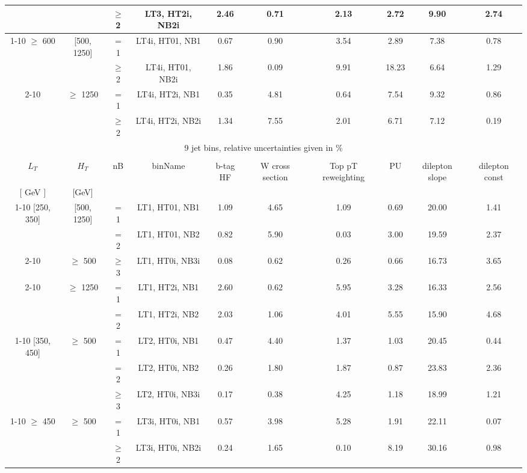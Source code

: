 \begin{table}[ht]
\begin{center}
\begin{tabular}{|c | c | c | c | c | c | c | c | c | c | }
  &  & $\geq$ 2&LT3, HT2i, NB2i & 2.46 & 0.71 & 2.13 & 2.72 & 9.90 & 2.74 \\ 
\cline{1-10} $\geq$ 600 & [500, 1250] & $=$ 1&LT4i, HT01, NB1 & 0.67 & 0.90 & 3.54 & 2.89 & 7.38 & 0.78 \\ 
  &  & $\geq$ 2&LT4i, HT01, NB2i & 1.86 & 0.09 & 9.91 & 18.23 & 6.64 & 1.29 \\ 
\cline{2-10}  & $\geq$ 1250 & $=$ 1&LT4i, HT2i, NB1 & 0.35 & 4.81 & 0.64 & 7.54 & 9.32 & 0.86 \\ 
  &  & $\geq$ 2&LT4i, HT2i, NB2i & 1.34 & 7.55 & 2.01 & 6.71 & 7.12 & 0.19 \\ 
 \hline 
\multicolumn{10}{|c|}{9 jet bins, relative uncertainties given in \%} \\ 
\multicolumn{10}{|c|}{} \\ \hline 
$L_T$ & $H_T$ & nB & binName & b-tag HF & W cross section & Top pT reweighting & PU & dilepton slope & dilepton const  \\ 
 $[$ GeV $]$  &   $[$GeV$]$ & &  &  &  &  &  &  &   \\ \hline 
\cline{1-10} [250, 350] & [500, 1250] & $=$ 1&LT1, HT01, NB1 & 1.09 & 4.65 & 1.09 & 0.69 & 20.00 & 1.41 \\ 
  &  & $=$ 2&LT1, HT01, NB2 & 0.82 & 5.90 & 0.03 & 3.00 & 19.59 & 2.37 \\ 
\cline{2-10}  & $\geq$ 500 & $\geq$ 3&LT1, HT0i, NB3i & 0.08 & 0.62 & 0.26 & 0.66 & 16.73 & 3.65 \\ 
\cline{2-10}  & $\geq$ 1250 & $=$ 1&LT1, HT2i, NB1 & 2.60 & 0.62 & 5.95 & 3.28 & 16.33 & 2.56 \\ 
  &  & $=$ 2&LT1, HT2i, NB2 & 2.03 & 1.06 & 4.01 & 5.55 & 15.90 & 4.68 \\ 
\cline{1-10} [350, 450] & $\geq$ 500 & $=$ 1&LT2, HT0i, NB1 & 0.47 & 4.40 & 1.37 & 1.03 & 20.45 & 0.44 \\ 
  &  & $=$ 2&LT2, HT0i, NB2 & 0.26 & 1.80 & 1.87 & 0.87 & 23.83 & 2.36 \\ 
  &  & $\geq$ 3&LT2, HT0i, NB3i & 0.17 & 0.38 & 4.25 & 1.18 & 18.99 & 1.21 \\ 
\cline{1-10} $\geq$ 450 & $\geq$ 500 & $=$ 1&LT3i, HT0i, NB1 & 0.57 & 3.98 & 5.28 & 1.91 & 22.11 & 0.07 \\ 
  &  & $\geq$ 2&LT3i, HT0i, NB2i & 0.24 & 1.65 & 0.10 & 8.19 & 30.16 & 0.98 \\ 
 \hline 
\hline 
\end{tabular} 
\end{center} 
\end{table} 
